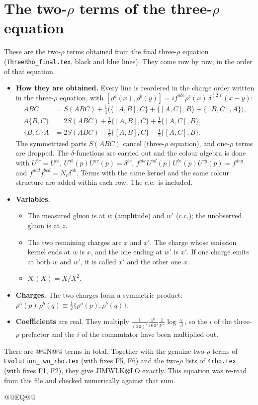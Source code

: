 \documentclass[9pt]{article}
\begin{document}
\section*{The two-$\rho$ terms of the three-$\rho$ equation}
These are the two-$\rho$ terms obtained from the final three-$\rho$ equation (\texttt{ThreeRho\_final.tex}, black and blue lines). They come row by row, in the order of that equation.
\begin{itemize}
\item \textbf{How they are obtained.} Every line is reordered in the charge order written in the three-$\rho$ equation, with $[\rho^a(x),\rho^b(y)]=if^{abc}\rho^c(x)\,\delta^{(2)}(x-y)$:
\begin{align*}
ABC&=S(ABC)+\tfrac14\big(\{[A,B],C\}+\{[A,C],B\}+\{[B,C],A\}\big),\\
A\{B,C\}&=2S(ABC)+\tfrac12\{[A,B],C\}+\tfrac12\{[A,C],B\},\\
\{B,C\}A&=2S(ABC)-\tfrac12\{[A,B],C\}-\tfrac12\{[A,C],B\}.
\end{align*}
The symmetrized parts $S(ABC)$ cancel (three-$\rho$ equation), and one-$\rho$ terms are dropped. The $\delta$-functions are carried out and the colour algebra is done with $U^{bc}=U^{cb}$, $U^{ab}(p)U^{ac}(p)=\delta^{bc}$, $f^{abc}U^{ad}(p)U^{be}(p)U^{cg}(p)=f^{deg}$ and $f^{acd}f^{bcd}=N_c\delta^{ab}$. Terms with the same kernel and the same colour structure are added within each row. The c.c.\ is included.
\item \textbf{Variables.}
\begin{itemize}
\item The measured gluon is at $w$ (amplitude) and $w'$ (c.c.); the unobserved gluon is at $z$.
\item The two remaining charges are $x$ and $x'$. The charge whose emission kernel ends at $w$ is $x$, and the one ending at $w'$ is $x'$. If one charge emits at both $w$ and $w'$, it is called $x'$ and the other one $x$.
\item $\mathcal K(X)=X/X^2$.
\end{itemize}
\item \textbf{Charges.} The two charges form a symmetric product: $\rho^a(p)\,\rho^b(q)\equiv\frac12\{\rho^a(p),\rho^b(q)\}$.
\item \textbf{Coefficients} are real. They multiply $\frac{1}{(2\pi)^3}\frac{g^4}{16\pi^5}\frac1{k^+}\log\frac\vee\Lambda$, so the $i$ of the three-$\rho$ prefactor and the $i$ of the commutator have been multiplied out.
\end{itemize}
There are @@N@@ terms in total. Together with the genuine two-$\rho$ terms of \texttt{Evolution\_two\_rho.tex} (with fixes F5, F6) and the two-$\rho$ lists of \texttt{4rho.tex} (with fixes F1, F2), they give JIMWLK$\otimes$LO exactly. This equation was re-read from this file and checked numerically against that sum.

@@EQ@@
\end{document}
